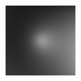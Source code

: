 \documentclass[11pt]{article}
\begin{document}
\begin{figure}[!hbt]
\begin{subfigure}[h]{0.3\textwidth}
  \end{subfigure} 
    \begin{subfigure}[h]{0.3\textwidth}
    \centering
    \includegraphics[width = \textwidth]{../synth-images/im3.png}
  \end{subfigure} 
  

\end{figure}
\end{document}
